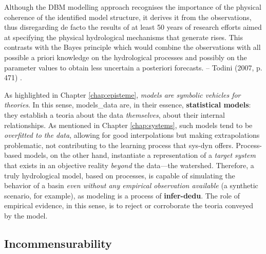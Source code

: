 \documentclass[./main_en.tex]{subfiles}
\begin{document}
\begin{adjustwidth}{100pt}{0pt}
\medskip
\small
Although the DBM modelling approach recognises the importance of the  physical coherence of the identified model structure, it derives it from the observations, thus disregarding de facto the results of at least 50 years of research efforts aimed at specifying the physical hydrological mechanisms that generate rises. This contrasts with the Bayes principle which would combine the observations with all possible a priori knowledge on the hydrological processes and possibly on the parameter values to obtain less uncertain a posteriori forecasts. -- Todini (2007, p. 471) \cite{Todini2007a}.
\medskip
\end{adjustwidth}
\noindent As highlighted in Chapter \ref{chap:episteme}, \textit{models are symbolic vehicles for theories}. In this sense, \gls{models_data} are, in their essence, \textbf{statistical models}: they establish a \gls{teoria} about the data \textit{themselves}, about their internal relationships. As mentioned in Chapter \ref{chap:systems}, such models tend to be \textit{overfitted to the data}, allowing for good interpolations but making extrapolations problematic, not contributing to the learning process that \gls{sys-dyn} offers. Process-based models, on the other hand, instantiate a representation of a \textit{target system} that exists in an objective reality \textit{beyond} the data—the watershed. Therefore, a truly hydrological \gls{model}, based on processes, is capable of simulating the behavior of a basin \textit{even without any empirical observation available} (a synthetic scenario, for example), as modeling is a process of \textbf{\gls{infer-dedu}}. The role of empirical evidence, in this sense, is to reject or corroborate the \gls{teoria} conveyed by the \gls{model}.

\subsection{Incommensurability} \label{sec:hydro:incomm}
\end{document}
